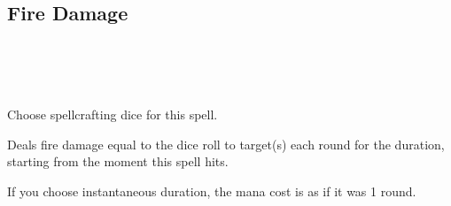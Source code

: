 \subsection*{Fire Damage}
 \\
\\
\\

Choose spellcrafting dice for this spell.

Deals fire damage equal to the dice roll to target(s) each round for the
duration, starting from the moment this spell hits.

If you choose instantaneous duration, the mana cost is as if it was 1
round.
